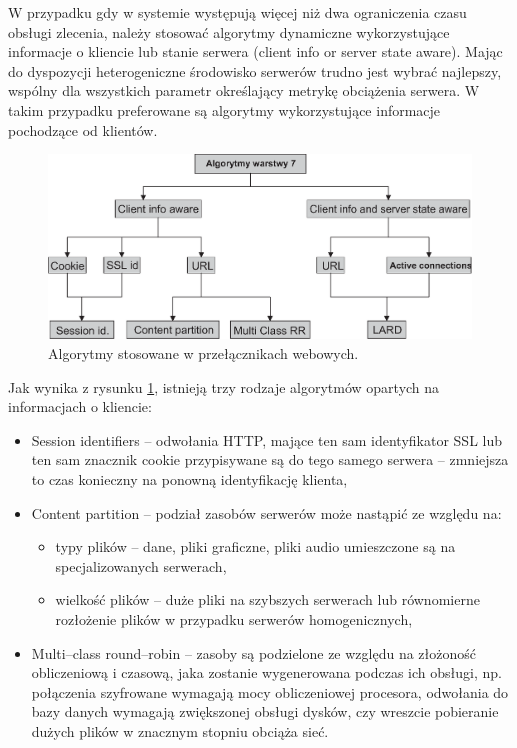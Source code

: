 W przypadku gdy w systemie występują więcej niż dwa ograniczenia czasu obsługi zlecenia, należy stosować algorytmy dynamiczne 
wykorzystujące informacje o kliencie lub stanie serwera (client info or server state aware). Mając do dyspozycji 
heterogeniczne środowisko serwerów trudno jest wybrać najlepszy, wspólny dla wszystkich parametr określający metrykę 
obciążenia serwera. W takim przypadku preferowane są algorytmy wykorzystujące informacje pochodzące od klientów.
\begin{figure}[h]
\centering
\includegraphics[width=4.9in]{./rysunki/level_7_alg.eps}
\caption{Algorytmy stosowane w przełącznikach webowych.}
\label{level_7_alg}
\end{figure}

Jak wynika z rysunku \ref{level_7_alg}, istnieją trzy rodzaje algorytmów opartych na informacjach o kliencie:
\begin{itemize}
\item Session identifiers -- odwołania HTTP, mające ten sam identyfikator SSL lub ten sam znacznik cookie przypisywane są do 
tego samego serwera -- zmniejsza to czas konieczny na ponowną identyfikację klienta,
\item Content partition -- podział zasobów serwerów może nastąpić ze względu na:
\begin{itemize}
\item typy plików -- dane, pliki graficzne, pliki audio umieszczone są na specjalizowanych serwerach,
\item wielkość plików -- duże pliki na szybszych serwerach lub równomierne rozłożenie plików w przypadku serwerów 
homogenicznych, 
\end{itemize}
\item Multi--class round--robin -- zasoby są podzielone ze względu na złożoność obliczeniową i czasową, jaka zostanie 
wygenerowana podczas ich obsługi, np. połączenia szyfrowane wymagają mocy obliczeniowej procesora, odwołania do bazy danych 
wymagają zwiększonej obsługi dysków, czy wreszcie pobieranie dużych plików w znacznym stopniu obciąża sieć.
\end{itemize}

